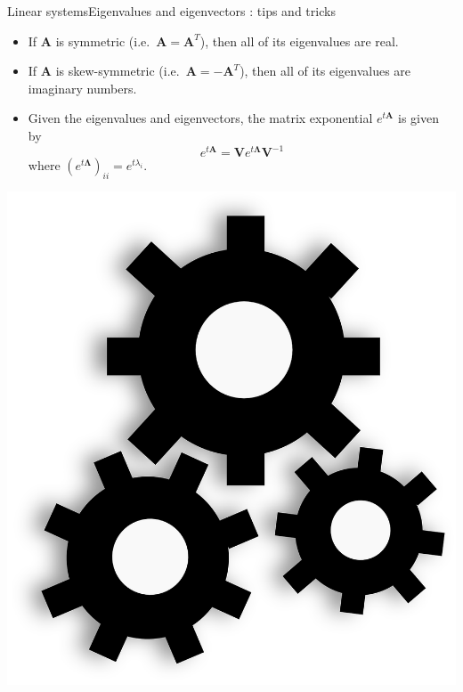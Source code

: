 \documentclass[usenames,dvipsnames,svgnames,10pt,aspectratio=169]{beamer}
\begin{document}
\begin{frame}[t, c]{Linear systems}{Eigenvalues and eigenvectors : tips and tricks}
  \begin{minipage}{.68\textwidth}
    \begin{itemize}
    \item If $\bm{A}$ is symmetric (i.e.\ $\bm{A} = \bm{A}^T$), then all of its eigenvalues are real.

      \bigskip

    \item If $\bm{A}$ is skew-symmetric (i.e.\ $\bm{A} = -\bm{A}^T$), then all of its eigenvalues are imaginary numbers.

      \bigskip

    \item Given the eigenvalues and eigenvectors, the matrix exponential $e^{t \bm{A}}$ is given by
      \[
      e^{t \bm{A}} = \bm{V} e^{t \boldsymbol{\Lambda}} \bm{V}^{-1}
      \]
      where $\left( e^{t \boldsymbol{\Lambda}} \right)_{ii} = e^{t \lambda_i}$.
    \end{itemize}
  \end{minipage}%
  \hfill
  \begin{minipage}{.28\textwidth}
    \centering
    \includegraphics[width=\textwidth]{Gears}
  \end{minipage}

  \vspace{1cm}
\end{frame}
\end{document}
